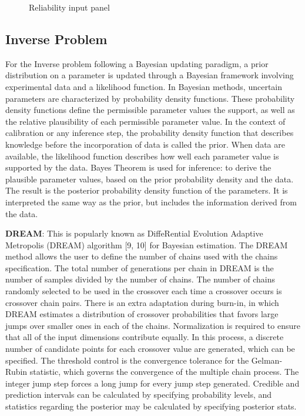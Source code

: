 \begin{figure}[!htbp]
  \caption{Reliability input panel}
  \label{fig:rel}
\end{figure}


\subsection{Inverse Problem}


For the Inverse problem following a Bayesian updating paradigm, a prior distribution on a parameter is updated through a Bayesian framework involving experimental data and a likelihood function. In Bayesian methods, uncertain parameters are characterized by probability density functions. These probability density functions define the permissible parameter values the support, as well as the relative plausibility of each permissible parameter value. In the context of calibration or any inference step, the probability density function that describes knowledge before the incorporation of data is called the prior. When data are available, the likelihood function describes how well each parameter value is supported by the data. Bayes Theorem is used for inference: to derive the plausible parameter values, based on the prior probability density and the data. The result is the posterior probability density function of the parameters. It is interpreted the same way as the prior, but includes the information derived from the data.


\textbf{DREAM}: This is popularly known as DiffeRential Evolution Adaptive Metropolis (DREAM) algorithm [9, 10] for Bayesian estimation. The DREAM method allows the user to define the number of chains used with the chains specification. The total number of generations per chain in DREAM is the number of samples divided by the number of chains. The number of chains randomly selected to be used in the crossover each time a crossover occurs is crossover chain pairs. There is an extra adaptation during burn-in, in which DREAM estimates a distribution of crossover probabilities that favors large jumps over smaller ones in each of the chains. Normalization is required to ensure that all of the input dimensions contribute equally. In this process, a discrete number of candidate points for each crossover value are generated, which can be specified. The threshold control is the convergence tolerance for the Gelman-Rubin statistic, which governs the convergence of the multiple chain process. The integer jump step forces a long jump for every jump step generated. Credible and prediction intervals can be calculated by specifying probability levels, and statistics regarding the posterior may be calculated by specifying posterior stats.

